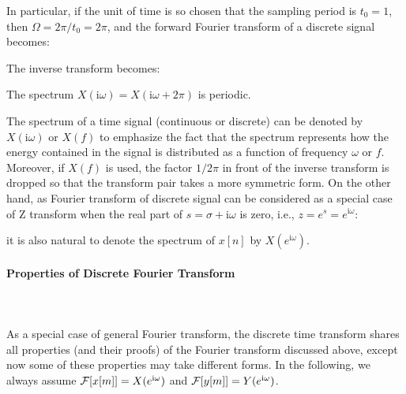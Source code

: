 	In particular, if the unit of time is so chosen that the sampling period is $t_0=1$, then $\Omega=2\pi/t_0=2\pi$, and the forward Fourier transform of a discrete signal becomes:
	
	The inverse transform becomes:
	
	The spectrum $X(\mathrm{i}\omega)=X(\mathrm{i}\omega+2\pi)$ is periodic.
	
	\begin{tcolorbox}[title=Remark,colframe=black,arc=10pt]
	The spectrum of a time signal (continuous or discrete) can be denoted by $X(\mathrm{i}\omega)$ or $X(f)$ to emphasize the fact that the spectrum represents how the energy contained in the signal is distributed as a function of frequency $\omega$ or $f$. Moreover, if $X(f)$ is used, the factor $1/2\pi$ in front of the inverse transform is dropped so that the transform pair takes a more symmetric form. On the other hand, as Fourier transform of discrete signal can be considered as a special case of Z transform when the real part of $s=\sigma+\mathrm{i}\omega$ is zero, i.e., $z=e^s=e^{\mathrm{i}\omega}$:
	
	it is also natural to denote the spectrum of $x[n]$ by $X(e^{\mathrm{i}\omega})$.
	\end{tcolorbox}
	
	
	\paragraph{Properties of Discrete Fourier Transform}\mbox{}\\\\
	As a special case of general Fourier transform, the discrete time transform  shares all properties (and their proofs) of the Fourier transform discussed above, except now some of these properties may take different forms. In the following, we always assume ${\cal F}[x[m]]=X(e^{\mathrm{i}\omega})$ and ${\cal F}[y[m]]=Y(e^{\mathrm{i}\omega})$. 
	
